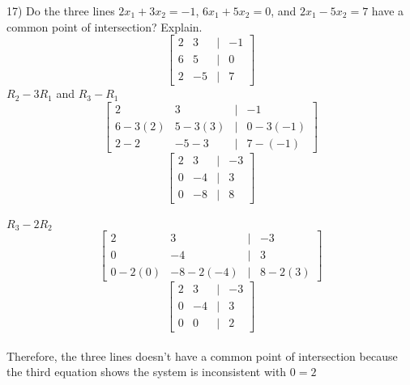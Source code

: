 \documentclass[]{article}
\begin{document}
17) Do the three lines $2x_1+3x_2=-1$, $6x_1+5x_2=0$, and $2x_1-5x_2=7$ have a common point of intersection? Explain.\\
\[
\begin{bmatrix}
	2&3&|&-1\\
	6&5&|&0\\
	2&-5&|&7
\end{bmatrix}
\]
$R_2-3R_1$ and $R_3-R_1$
\[
\begin{bmatrix}
	2&3&|&-1\\
	6-3(2)&5-3(3)&|&0-3(-1)\\
	2-2&-5-3&|&7-(-1)
\end{bmatrix}
\]
\[
\begin{bmatrix}
	2&3&|&-3\\
	0&-4&|&3\\
	0&-8&|&8
\end{bmatrix}
\]\\
$R_3-2R_2$
\[
\begin{bmatrix}
	2&3&|&-3\\
	0&-4&|&3\\
	0-2(0)&-8-2(-4)&|&8-2(3)
\end{bmatrix}
\]
\[
\begin{bmatrix}
	2&3&|&-3\\
	0&-4&|&3\\
	0&0&|&2
\end{bmatrix}
\]\\
Therefore, the three lines doesn't have a common point of intersection because the third equation shows the system is inconsistent with $0=2$\\
\end{document}
